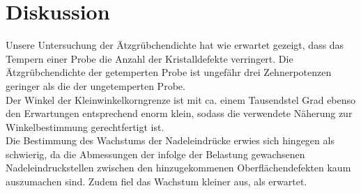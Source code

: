 \section{Diskussion}
Unsere Untersuchung der Ätzgrübchendichte hat wie erwartet gezeigt, dass das Tempern einer Probe die Anzahl der Kristalldefekte verringert.
Die Ätzgrübchendichte der getemperten Probe ist ungefähr drei Zehnerpotenzen geringer als die der ungetemperten Probe.\\
Der Winkel der Kleinwinkelkorngrenze ist mit ca. einem Tausendstel Grad ebenso den Erwartungen entsprechend enorm klein, sodass die verwendete
Näherung zur Winkelbestimmung gerechtfertigt ist.\\
Die Bestimmung des Wachstums der Nadeleindrücke erwies sich hingegen als schwierig, da die Abmessungen der infolge der Belastung gewachsenen Nadeleindruckstellen
zwischen den hinzugekommenen Oberflächendefekten kaum auszumachen sind. Zudem fiel das Wachstum kleiner aus, als erwartet.